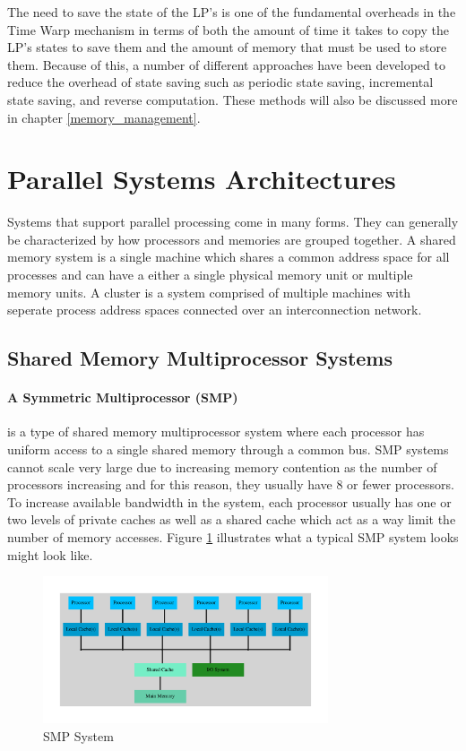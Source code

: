 \documentclass[11pt]{book}
\begin{document}
The need to save the state of the LP's is one of the fundamental overheads in the Time Warp
mechanism in terms of both the amount of time it takes to copy the LP's states to save them
and the amount of memory that must be used to store them. Because of this, a number of
different approaches have been developed to reduce the overhead of state saving such as
periodic state saving, incremental state saving, and reverse computation. These methods
will also be discussed more in chapter \ref{memory_management}.

\section{Parallel Systems Architectures}

Systems that support parallel processing come in many forms. They can generally be characterized
by how processors and memories are grouped together. A shared memory system is a single machine
which shares a common address space for all processes and can have a either a single physical
memory unit or multiple memory units. A cluster is a system comprised of multiple machines with
seperate process address spaces connected over an interconnection network.

\subsection{Shared Memory Multiprocessor Systems}

\paragraph{A Symmetric Multiprocessor (SMP)} is a type of shared memory multiprocessor
system where each processor has uniform access to a single shared memory through a common
bus. SMP systems cannot scale very large due to increasing memory contention as the number of
processors increasing and for this reason, they usually have 8 or fewer processors.
To increase available bandwidth in the system, each processor usually has one or two
levels of private caches as well as a shared cache which act as a way limit the number of
memory accesses. Figure \ref{smp} illustrates what a typical SMP system looks might look
like.

\begin{figure}[H]
    \centering
    \includegraphics[width=0.75\textwidth,quiet]{figs/graphviz/smp.pdf}
    \caption{SMP System}\label{smp}
\end{figure}
\end{document}
